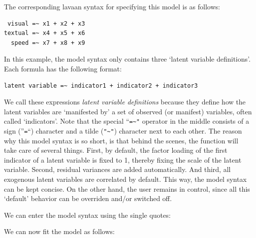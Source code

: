 The corresponding lavaan syntax for specifying this model is as follows:

\begin{verbatim}
 visual =~ x1 + x2 + x3
textual =~ x4 + x5 + x6
  speed =~ x7 + x8 + x9
\end{verbatim}

In this example, the model syntax only contains three `latent variable
definitions'. Each formula has the following format:

\begin{verbatim}
latent variable =~ indicator1 + indicator2 + indicator3
\end{verbatim}

We call these expressions \emph{latent variable definitions} because
they define how the latent variables are `manifested by' a set of
observed (or manifest) variables, often called `indicators'. Note that
the special ``\texttt{=\textasciitilde{}"} operator in the middle
consists of a sign (''\texttt{=}``) character and a tilde
(\texttt{"\textasciitilde{}"}) character next to each other. The reason
why this model syntax is so short, is that behind the scenes, the
function will take care of several things. First, by default, the factor
loading of the first indicator of a latent variable is fixed to 1,
thereby fixing the scale of the latent variable. Second, residual
variances are added automatically. And third, all exogenous latent
variables are correlated by default. This way, the model syntax can be
kept concise. On the other hand, the user remains in control, since all
this `default' behavior can be overriden and/or switched off.

We can enter the model syntax using the single quotes:

\begin{Shaded}
\begin{Highlighting}[]
\end{Highlighting}
\end{Shaded}

We can now fit the model as follows:

\begin{Shaded}
\begin{Highlighting}[]
\StringTok{ } 
\end{Highlighting}
\end{Shaded}


